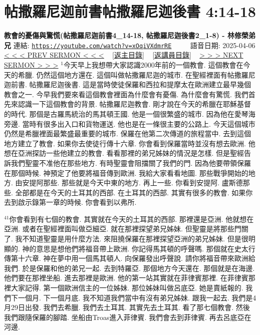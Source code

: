 \documentclass{book}
\begin{document}
\section{帖撒羅尼迦前書帖撒羅尼迦後書 4:14-18}
\label{sec:xOqiVXdmrRE}
\textbf{教會的憂傷與驚慌(帖撒羅尼迦前書4\_14-18, 帖撒羅尼迦後書2\_1-8) - 林修榮弟兄}
\newline
\newline
連結: \href{https://youtube.com/watch?v=xOqiVXdmrRE}{\texttt{https://youtube.com/watch?v=xOqiVXdmrRE}} ~~~~ 語音日期: 2025-04-06
\newline
\newline
\hyperref[sec:l8BFPdIOADs]{< < < PREV SERMON < < <}
~
\hyperlink{toc}{[返主目錄]}
~
\hyperref[ch:preacher6]{[返講員目錄]}
~
\hyperref[sec:fJrsPMmDHtU]{> > > NEXT SERMON > > >}
\newline
\newline
$^{1}$今天早上我想帶大家認識2000年前的一個教會.
這個教會在今天的希臘.
仍然這個地方還在.
這個叫做帖撒羅尼迦的城市.
在聖經裡面有帖撒羅尼迦前書.
帖撒羅尼迦後書.
這是當時使徒保羅和西拉和提摩太在歐洲建立最早幾個教會之一.
今早我們要來看這個教會裡面為什麼會有憂傷.
為什麼會有驚慌.
我們首先來認識一下這個教會的背景.
帖撒羅尼迦教會.
剛才說在今天的希臘在耶穌基督的時代.
那個是古羅馬統治的馬其頓王國.
他是一個很繁盛的城市.
因為他在愛琴海旁邊.
當時有很多出入口和貨物運送.
他也是在一條很主要的公路上.
今天這個城市仍然是希臘裡面最繁盛最重要的城市.
保羅在他第二次傳道的旅程當中.
去到這個地方建立了教會.
如果你去使徒行傳十六章.
你會看到保羅當時並沒有想去歐洲.
他想在亞洲探訪一些他建立的教會.
看看那裡的弟兄姊妹的情況是怎樣.
但是聖經告訴我們聖靈不准他在那些地方.
有時聖靈會阻擋關了我們的門.
因為他要帶領保羅在那個時候.
神預定了他要將福音傳到歐洲.
我給大家看看地圖.
那些戰爭開始的地方.
由安提阿那些.
那些就是今天中東的地方.
再上一些.
你看到安提阿.
盧斯德那些.
全部都是在今天的土耳其的西部.
在土耳其的西部.
其實有很多的教會.
如果你去到啟示錄第一章的時候.
你會看到以弗所.

$^{41}$你會看到有七個的教會.
其實就在今天的土耳其的西部.
那裡還是亞洲.
他就想在亞洲.
或者在聖經裡面叫做亞細亞.
就在那裡探望弟兄姊妹.
但聖靈是將那些門關了.
我不知道聖靈是用什麼方法.
來阻撓保羅在那裡探望亞洲的弟兄姊妹.
但是很明顯的.
神的意思是想他們將福音帶上歐洲.
你記得馬其頓的呼聲嗎.
那個就在史太行傳第十六章.
神在夢中用一個馬其頓人.
向保羅發出呼聲說.
請你將福音帶來歐洲給我們.
於是保羅和他的弟兄一起.
去到特羅亞.
那個地方今天還在.
那個就是在海邊.
他們要在那裡坐船.
進去那裡是歐洲.
他的第一站其實就在菲律賓那裡.
在菲律賓那裡大家記得.
第一個歐洲信主的一位姊妹.
那位姊妹叫做呂底亞.
她是賣紙報的.
我們下一個月.
下一個月底.
我不知道我們當中有沒有弟兄姊妹.
跟我一起去.
我們是4月29日出發.
我們去希臘.
我們去土耳其.
其實先去土耳其.
看了那七個教會.
然後我們跟隨保羅的腳踏.
坐船由Troas進入菲律賓.
我們會去到菲律賓.
再去呂底亞在河邊.
\end{document}
